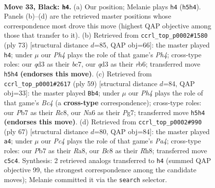 \documentclass[11pt]{article}
\begin{document}
\clearpage

\begin{figure}[p]\centering
\begin{subfigure}{0.46\textwidth}\centering
\resizebox{\linewidth}{!}{%
\newchessgame
\chessboard[
  setfen={1rb5/pp4k1/n5p1/2pP2pp/8/PB1Q1PPq/1P5P/2RR2K1 b - - 6 33},
  showmover=false,
  pgfstyle=straightmove, color=movearrow, markmove={h5-h4}
]}
\caption{}
\end{subfigure}\hfill
\begin{subfigure}{0.46\textwidth}\centering
\resizebox{\linewidth}{!}{%
\newchessgame
\chessboard[
  setfen={r3r3/2B3pk/PR1p4/2pP1bqp/2P1pp2/5P2/1Q4PP/R6K b - - 3 37},
  showmover=false,
  pgfstyle=straightmove, color=movearrow, markmove={h5-h4}
]}
\caption{}
\end{subfigure}
\\[4pt]
\begin{subfigure}{0.46\textwidth}\centering
\resizebox{\linewidth}{!}{%
\newchessgame
\chessboard[
  setfen={2r2r2/5ppk/6p1/pNb3Pn/P1B4P/4q3/1PQ5/1K1R2R1 b - - 3 30},
  showmover=false,
  pgfstyle=straightmove, color=movearrow, markmove={c5-b4}
]}
\caption{}
\end{subfigure}\hfill
\begin{subfigure}{0.46\textwidth}\centering
\resizebox{\linewidth}{!}{%
\newchessgame
\chessboard[
  setfen={r5kr/5pp1/7p/pp1bPQ1P/2qP4/2P5/1B3RP1/R5K1 b - - 5 34},
  showmover=false,
  pgfstyle=straightmove, color=movearrow, markmove={a5-a4}
]}
\caption{}
\end{subfigure}
\caption{\textbf{Move 33, Black: \texttt{h4}.} (a) Our position; Melanie plays \texttt{h4} (\texttt{h5h4}). Panels (b)--(d) are the retrieved master positions whose correspondence most drove this move (highest QAP objective among those that transfer to it). (b) Retrieved from \texttt{ccrl\_top\_p0002\#1580} (ply 73) [structural distance $d$=85, QAP obj=66]: the master played \texttt{h4}; under $\mu$ our \emph{Ph4} plays the role of that game's \emph{Ph4}; cross-type roles: our \emph{q}d3 as their \emph{b}c7, our \emph{q}d3 as their \emph{r}b6; transferred move \texttt{h5h4} \textbf{(endorses this move)}. (c) Retrieved from \texttt{ccrl\_top\_p0001\#2617} (ply 59) [structural distance $d$=84, QAP obj=33]: the master played \texttt{Bb4}; under $\mu$ our \emph{Ph4} plays the role of that game's \emph{Bc4} (a \textbf{cross-type} correspondence); cross-type roles: our \emph{P}b7 as their \emph{R}c8, our \emph{N}a6 as their \emph{P}g7; transferred move \texttt{h5h4} \textbf{(endorses this move)}. (d) Retrieved from \texttt{ccrl\_top\_p0002\#990} (ply 67) [structural distance $d$=80, QAP obj=84]: the master played \texttt{a4}; under $\mu$ our \emph{Pc4} plays the role of that game's \emph{Pa4}; cross-type roles: our \emph{P}b7 as their \emph{R}a8, our \emph{B}c8 as their \emph{R}h8; transferred move \texttt{c5c4}. Synthesis: 2 retrieved analogs transferred to \texttt{h4} (summed QAP objective 99, the strongest correspondence among the candidate moves); Melanie committed it via the \texttt{search} selector.}
\label{fig:thought-m65}
\end{figure}
\end{document}
